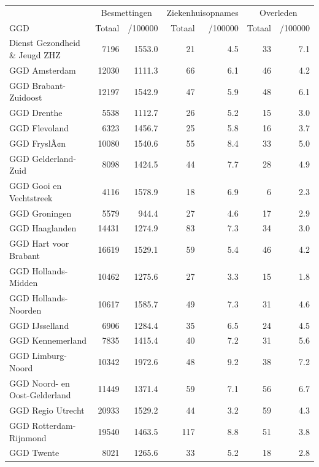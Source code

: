 \documentclass[
  english,
  man,floatsintext]{apa6}
\begin{document}
\begin{table}
\centering\begingroup\fontsize{10}{12}\selectfont

\begin{threeparttable}
\begin{tabular}{lrrrrrr}
\toprule
\multicolumn{1}{c}{ } & \multicolumn{2}{c}{Besmettingen} & \multicolumn{2}{c}{Ziekenhuisopnames} & \multicolumn{2}{c}{Overleden} \\
\cmidrule(l{3pt}r{3pt}){2-3} \cmidrule(l{3pt}r{3pt}){4-5} \cmidrule(l{3pt}r{3pt}){6-7}
GGD & Totaal & /100000 & Totaal & /100000 & Totaal & /100000\\
\midrule
Dienst Gezondheid \& Jeugd ZHZ & 7196 & 1553.0 & 21 & 4.5 & 33 & 7.1\\
GGD Amsterdam & 12030 & 1111.3 & 66 & 6.1 & 46 & 4.2\\
GGD Brabant-Zuidoost & 12197 & 1542.9 & 47 & 5.9 & 48 & 6.1\\
GGD Drenthe & 5538 & 1112.7 & 26 & 5.2 & 15 & 3.0\\
GGD Flevoland & 6323 & 1456.7 & 25 & 5.8 & 16 & 3.7\\
GGD FryslÃ¢n & 10080 & 1540.6 & 55 & 8.4 & 33 & 5.0\\
GGD Gelderland-Zuid & 8098 & 1424.5 & 44 & 7.7 & 28 & 4.9\\
GGD Gooi en Vechtstreek & 4116 & 1578.9 & 18 & 6.9 & 6 & 2.3\\
GGD Groningen & 5579 & 944.4 & 27 & 4.6 & 17 & 2.9\\
GGD Haaglanden & 14431 & 1274.9 & 83 & 7.3 & 34 & 3.0\\
GGD Hart voor Brabant & 16619 & 1529.1 & 59 & 5.4 & 46 & 4.2\\
GGD Hollands-Midden & 10462 & 1275.6 & 27 & 3.3 & 15 & 1.8\\
GGD Hollands-Noorden & 10617 & 1585.7 & 49 & 7.3 & 31 & 4.6\\
GGD IJsselland & 6906 & 1284.4 & 35 & 6.5 & 24 & 4.5\\
GGD Kennemerland & 7835 & 1415.4 & 40 & 7.2 & 31 & 5.6\\
GGD Limburg-Noord & 10342 & 1972.6 & 48 & 9.2 & 38 & 7.2\\
GGD Noord- en Oost-Gelderland & 11449 & 1371.4 & 59 & 7.1 & 56 & 6.7\\
GGD Regio Utrecht & 20933 & 1529.2 & 44 & 3.2 & 59 & 4.3\\
GGD Rotterdam-Rijnmond & 19540 & 1463.5 & 117 & 8.8 & 51 & 3.8\\
GGD Twente & 8021 & 1265.6 & 33 & 5.2 & 18 & 2.8\\

\end{tabular}
\end{threeparttable}
\end{table}
\end{document}
